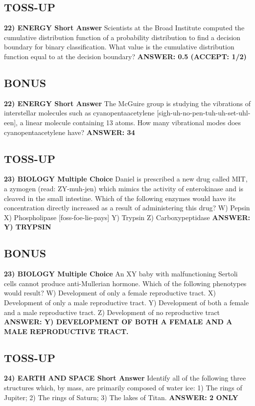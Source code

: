 \documentclass{article}
\begin{document}
\newpage

\subsection*{TOSS-UP}
\textbf{22) ENERGY Short Answer} Scientists at the Broad Institute computed the cumulative distribution function of a probability distribution to find a decision boundary for binary classification. What value is the cumulative distribution function equal to at the decision boundary?
\textbf{ANSWER: 0.5 (ACCEPT: 1/2)}

\subsection*{BONUS}
\textbf{22) ENERGY Short Answer} The McGuire group is studying the vibrations of interstellar molecules such as cyanopentaacetylene [sigh-uh-no-pen-tuh-uh-set-uhl-een], a linear molecule containing 13 atoms. How many vibrational modes does cyanopentaacetylene have?
\textbf{ANSWER: 34}

\subsection*{TOSS-UP}
\textbf{23) BIOLOGY Multiple Choice} Daniel is prescribed a new drug called MIT, a zymogen (read: ZY-muh-jen) which mimics the activity of enterokinase and is cleaved in the small intestine. Which of the following enzymes would have its concentration directly increased as a result of administering this drug?
W) Pepsin
X) Phospholipase [foss-foe-lie-pays]
Y) Trypsin
Z) Carboxypeptidase
\textbf{ANSWER: Y) TRYPSIN}

\subsection*{BONUS}
\textbf{23) BIOLOGY Multiple Choice} An XY baby with malfunctioning Sertoli cells cannot produce anti-Mullerian hormone. Which of the following phenotypes would result?
W) Development of only a female reproductive tract.
X) Development of only a male reproductive tract.
Y) Development of both a female and a male reproductive tract.
Z) Development of no reproductive tract
\textbf{ANSWER: Y) DEVELOPMENT OF BOTH A FEMALE AND A MALE REPRODUCTIVE TRACT.}

\newpage

\subsection*{TOSS-UP}
\textbf{24) EARTH AND SPACE Short Answer} Identify all of the following three structures which, by mass, are primarily composed of water ice: 1) The rings of Jupiter; 2) The rings of Saturn; 3) The lakes of Titan.
\textbf{ANSWER: 2 ONLY}
\end{document}
